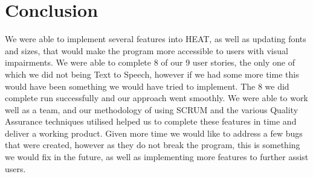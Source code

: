 
\section{\textbf{Conclusion}}

We were able to implement several features into HEAT, as well as updating fonts and sizes, that would make the program more accessible to users with visual impairments. We were able to complete 8 of our 9 user stories, the only one of which we did not being Text to Speech, however if we had some more time this would have been something we would have tried to implement. The 8 we did complete run successfully and our approach went smoothly. We were able to work well as a team, and our methodology of using SCRUM and the various Quality Assurance techniques utilised helped us to complete these features in time and deliver a working product. Given more time we would like to address a few bugs that were created, however as they do not break the program, this is something we would fix in the future, as well as implementing more features to further assist users. 

\newpage